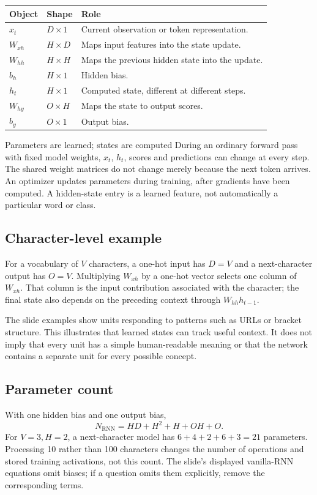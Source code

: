 \documentclass[11pt]{article}
\begin{document}
\begin{longtable}{@{}P{.20\textwidth}P{.20\textwidth}P{.50\textwidth}@{}}
\toprule Object & Shape & Role\\\midrule\endhead
$x_t$ & $D\times1$ & Current observation or token representation.\\
$W_{xh}$ & $H\times D$ & Maps input features into the state update.\\
$W_{hh}$ & $H\times H$ & Maps the previous hidden state into the update.\\
$b_h$ & $H\times1$ & Hidden bias.\\
$h_t$ & $H\times1$ & Computed state, different at different steps.\\
$W_{hy}$ & $O\times H$ & Maps the state to output scores.\\
$b_y$ & $O\times1$ & Output bias.\\\bottomrule
\end{longtable}
\begin{keyidea}{Parameters are learned; states are computed}
During an ordinary forward pass with fixed model weights, $x_t$, $h_t$, scores and predictions can change at every step. The shared weight matrices do not change merely because the next token arrives. An optimizer updates parameters during training, after gradients have been computed. A hidden-state entry is a learned feature, not automatically a particular word or class.
\end{keyidea}

\subsection{Character-level example}
For a vocabulary of $V$ characters, a one-hot input has $D=V$ and a next-character output has $O=V$. Multiplying $W_{xh}$ by a one-hot vector selects one column of $W_{xh}$. That column is the input contribution associated with the character; the final state also depends on the preceding context through $W_{hh}h_{t-1}$.

The slide examples show units responding to patterns such as URLs or bracket structure. This illustrates that learned states can track useful context. It does not imply that every unit has a simple human-readable meaning or that the network contains a separate unit for every possible concept.

\subsection{Parameter count}
With one hidden bias and one output bias,
\[
N_{\mathrm{RNN}}=HD+H^2+H+OH+O.
\]
For $V=3,H=2$, a next-character model has $6+4+2+6+3=21$ parameters. Processing 10 rather than 100 characters changes the number of operations and stored training activations, not this count. The slide's displayed vanilla-RNN equations omit biases; if a question omits them explicitly, remove the corresponding terms.
\end{document}
